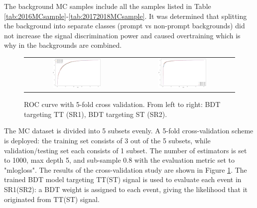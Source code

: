 The background MC samples include all the samples listed in Table \ref{tab:2016MCsample}-\ref{tab:20172018MCsample}. It was determined that splitting the background into separate classes (prompt vs non-prompt backgrounds) did not increase the signal discrimination power and caused overtraining which is why in the backgrounds are combined. 

\begin{figure}[tbh!]
 \begin{center}
 \begin{tabular}{cc}
  \includegraphics[width=0.48\textwidth]{figures/Part3/BDT/5foldTT}&
    \includegraphics[width=0.48\textwidth]{figures/Part3/BDT/5foldST}\\
 \end{tabular}
 \caption{ROC curve with 5-fold cross validation. From left to right: BDT targeting TT (SR1), BDT targeting ST (SR2).}
 \label{fig:5fold}
 \end{center}
\end{figure}

The MC dataset is divided into 5 subsets evenly. A 5-fold cross-validation scheme is deployed: the training set consists of 3 out of the 5 subsets, while validation/testing set each consists of 1 subset. The number of estimators is set to 1000, max depth 5, and sub-sample 0.8 with the evaluation metric set to "mlogloss".  The results of the cross-validation study are shown in Figure \ref{fig:5fold}. The trained BDT model targeting TT(ST) signal is used to evaluate each event in SR1(SR2): a BDT weight is assigned to each event, giving the likelihood that it originated from TT(ST) signal. 

